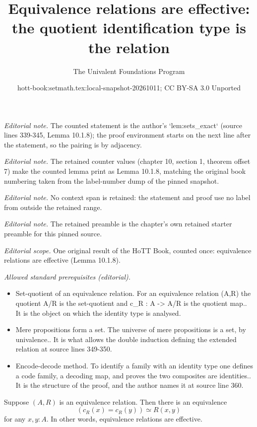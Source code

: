 \documentclass[10pt,a4paper]{article}
\title{Equivalence relations are effective: the quotient identification type is the relation}
\author{The Univalent Foundations Program}
\date{hott-book:setmath.tex:local-snapshot-20261011; CC BY-SA 3.0 Unported}
\newcounter{chapter}
\newcommand{\pairr}[1]{{\mathopen{}(#1)\mathclose{}}}
\newcommand{\eqvsym}{\simeq}    %
\theoremstyle{definition}
\theoremstyle{remark}
\numberwithin{equation}{section}
\begin{document}
\maketitle
\setcounter{chapter}{10}
\setcounter{section}{1}
\setcounter{thm}{7}
\noindent\textit{Editorial note.} The counted statement is the author's `lem:sets\_exact` (source lines 339-345, Lemma 10.1.8); the proof environment starts on the next line after the statement, so the pairing is by adjacency.\par\medskip
\noindent\textit{Editorial note.} The retained counter values (chapter 10, section 1, theorem offset 7) make the counted lemma print as Lemma 10.1.8, matching the original book numbering taken from the label-number dump of the pinned snapshot.\par\medskip
\noindent\textit{Editorial note.} No context span is retained: the statement and proof use no label from outside the retained range.\par\medskip
\noindent\textit{Editorial note.} The retained preamble is the chapter's own retained starter preamble for this pinned source.\par\medskip
\noindent\textit{Editorial scope.} One original result of the HoTT Book, counted once: equivalence relations are effective (Lemma 10.1.8).\par\medskip
\noindent\textit{Allowed standard prerequisites (editorial).}\begin{itemize}
\item Set-quotient of an equivalence relation. For an equivalence relation (A,R) the quotient A/R is the set-quotient and c\_R : A -> A/R is the quotient map.. It is the object on which the identity type is analysed.
\item Mere propositions form a set. The universe of mere propositions is a set, by univalence.. It is what allows the double induction defining the extended relation at source lines 349-350.
\item Encode-decode method. To identify a family with an identity type one defines a code family, a decoding map, and proves the two composites are identities.. It is the structure of the proof, and the author names it at source line 360.
\end{itemize}\medskip
\begin{lem}\label{lem:sets_exact}
Suppose $\pairr{A,R}$ is an equivalence relation. Then there is an equivalence
\begin{equation*}
(c_R(x)= c_R(y))\eqvsym R(x,y)
\end{equation*}
for any $x,y:A$. In other words, equivalence relations are effective.
\end{lem}
\end{document}
